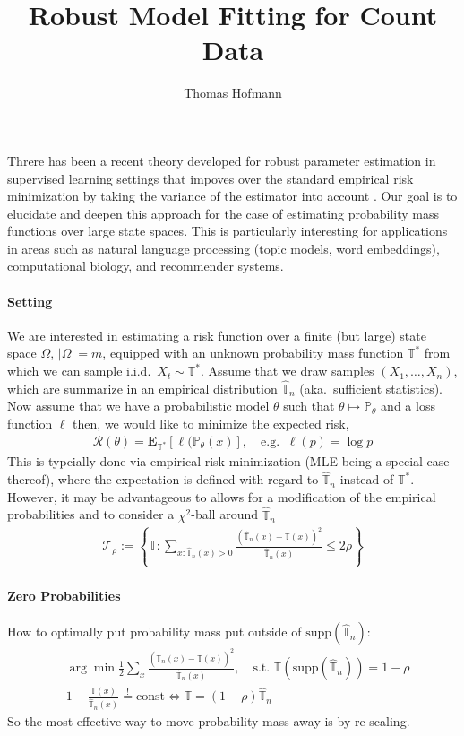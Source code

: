 \documentclass{article}
\title{
	Robust Model Fitting for Count Data
}
\author{
	Thomas Hofmann
}
\newcommand{\E}{{\mathbf E}}
\newcommand{\pTrue}{{{\mathbb T}^*}}
\newcommand{\pAny}{{\mathbb T}}
\newcommand{\pEmp}{{\hat{\mathbb T}_n}}
\begin{document}
\maketitle 

Threre has been a recent theory developed for robust parameter estimation in supervised learning settings that impoves over the standard empirical risk minimization by taking the variance of the estimator into account \cite{namkoong2016stochastic,namkoong2017variance}. Our goal is to elucidate and deepen this approach for the case of estimating probability mass functions over large state spaces. This is particularly interesting for applications in areas such as natural language processing (topic models, word embeddings), computational biology, and recommender systems.\\

\paragraph{Setting} 
We are interested in estimating a risk function over a finite (but large) state space $\Omega$, $|\Omega|=m$, equipped with an unknown probability mass function $\pTrue$ from which we can sample i.i.d.~$X_t \sim \pTrue$. Assume that we draw samples $(X_1,\dots,X_n)$, which are summarize in an empirical distribution $\pEmp$ (aka.~sufficient statistics). Now assume that we have a probabilistic model $\theta$ such that $\theta \mapsto \mathbb P_\theta$ and a loss function $\ell$ then, we would like to minimize the expected risk,
\begin{align}
\mathcal R(\theta) = \E_{\pTrue}[\ell(\mathbb P_\theta(x)], \quad \text{e.g.} \;\; \ell(p) = \log p
\end{align} 
This is typcially done via empirical risk minimization (MLE being a special case thereof), where the expectation is defined with regard to $\pEmp$ instead of $\pTrue$. However, it may be advantageous to allows for a modification of the empirical probabilities and to consider a $\chi^2$-ball around $\pEmp$
\begin{align}
\mathcal T_{\rho} := 
\left\{  
	\pAny: \sum_{x: \pEmp(x)>0} \frac{(\pEmp(x) - \pAny(x))^2}{\pEmp(x)}  \le 2 \rho
\right\}
\end{align} 

\paragraph{Zero Probabilities}
How to optimally put probability mass put outside of $\text{supp}(\pEmp)$:
\begin{align}
& \arg\min \frac 12 \sum_x  \frac{(\pEmp(x) - \pAny(x))^2}{\pEmp(x)} , \quad \text{s.t. } \pAny(\text{supp}(\pEmp)) = 1- \rho  \\
& 1 - \frac{\pAny(x)}{\pEmp(x)} \stackrel != \text{const} \iff \pAny = (1-\rho) \pEmp
\end{align}
So the most effective way to move probability mass away is by re-scaling. 



\end{document}
